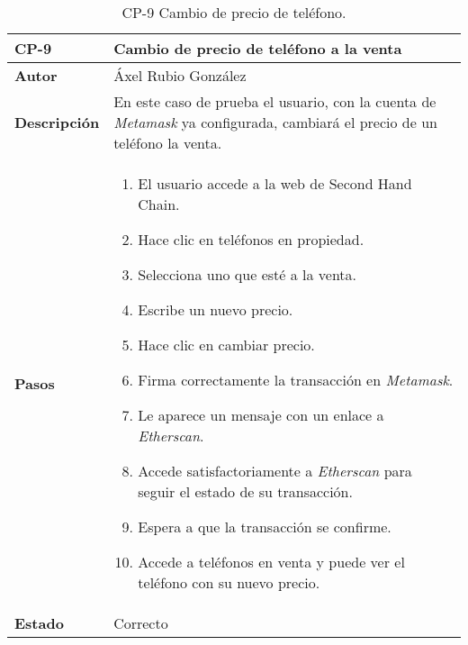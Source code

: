 \begin{table}[p]
	\centering
	\begin{tabularx}{\linewidth}{ p{} p{} }
		\toprule
		\textbf{CP-9}    & \textbf{Cambio de precio de teléfono a la venta}\\
		\toprule
		\textbf{Autor}                & Áxel Rubio González \\
		\textbf{Descripción}          & En este caso de prueba el usuario, con la cuenta de \textit{Metamask} ya configurada, cambiará el precio de un teléfono la venta. \\
		\textbf{Pasos}             &
		\begin{enumerate}
			\def\labelenumi{\arabic{enumi}.}
			\tightlist
			\item El usuario accede a la web de Second Hand Chain.
                \item Hace clic en teléfonos en propiedad.
                \item Selecciona uno que esté a la venta.
                \item Escribe un nuevo precio.
                \item Hace clic en cambiar precio.
                \item Firma correctamente la transacción en \textit{Metamask}.
                \item Le aparece un mensaje con un enlace a \textit{Etherscan}.
                \item Accede satisfactoriamente a \textit{Etherscan} para seguir el estado de su transacción.
                \item Espera a que la transacción se confirme.
                \item Accede a teléfonos en venta y puede ver el teléfono con su nuevo precio.
		\end{enumerate}\\
		\textbf{Estado}          & Correcto \\
		\bottomrule
	\end{tabularx}
	\caption{CP-9 Cambio de precio de teléfono.}
\end{table}

